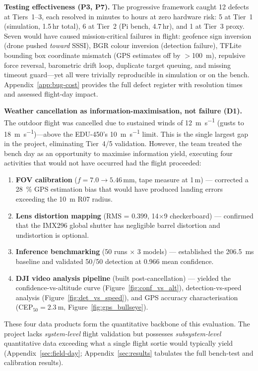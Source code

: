 \textbf{Testing effectiveness (P3, P7).}
The progressive framework caught 12 defects at Tiers~1--3, each resolved in minutes to hours at zero hardware risk: 5 at Tier~1 (simulation, 1.5\,hr total), 6 at Tier~2 (Pi bench, 4.7\,hr), and 1 at Tier~3 proxy. Seven would have caused mission-critical failures in flight: geofence sign inversion (drone pushed \emph{toward} SSSI), BGR colour inversion (detection failure), TFLite bounding box coordinate mismatch (GPS estimates off by $>$\SI{100}{\metre}), repulsive force reversal, barometric drift loop, duplicate target queuing, and missing timeout guard---yet all were trivially reproducible in simulation or on the bench. Appendix~\ref{app:bug-cost} provides the full defect register with resolution times and assessed flight-day impact.

\textbf{Weather cancellation as information-maximisation, not failure (D1).}
The outdoor flight was cancelled due to sustained winds of \SI{12}{\metre\per\second} (gusts to \SI{18}{\metre\per\second})---above the EDU-450's \SI{10}{\metre\per\second} limit. This is the single largest gap in the project, eliminating Tier~4/5 validation. However, the team treated the bench day as an opportunity to maximise information yield, executing four activities that would not have occurred had the flight proceeded:

\begin{enumerate}[nosep]
    \item \textbf{FOV calibration} ($f{=}7.0 \to 5.46$\,mm, tape measure at 1\,m) --- corrected a \SI{28}{\percent} GPS estimation bias that would have produced landing errors exceeding the \SI{10}{\metre} R07 radius.
    \item \textbf{Lens distortion mapping} (RMS = 0.399, 14$\times$9 checkerboard) --- confirmed that the IMX296 global shutter has negligible barrel distortion and undistortion is optional.
    \item \textbf{Inference benchmarking} (50 runs $\times$ 3 models) --- established the \SI{206.5}{\milli\second} baseline and validated 50/50 detection at 0.966 mean confidence.
    \item \textbf{DJI video analysis pipeline} (built post-cancellation) --- yielded the confidence-vs-altitude curve (Figure~\ref{fig:conf_vs_alt}), detection-vs-speed analysis (Figure~\ref{fig:det_vs_speed}), and GPS accuracy characterisation (CEP$_{50}{=}\SI{2.3}{\metre}$, Figure~\ref{fig:gps_bullseye}).
\end{enumerate}

\noindent These four data products form the quantitative backbone of this evaluation. The project lacks \emph{system-level} flight validation but possesses \emph{subsystem-level} quantitative data exceeding what a single flight sortie would typically yield (Appendix~\ref{sec:field-day}; Appendix~\ref{sec:results} tabulates the full bench-test and calibration results).

